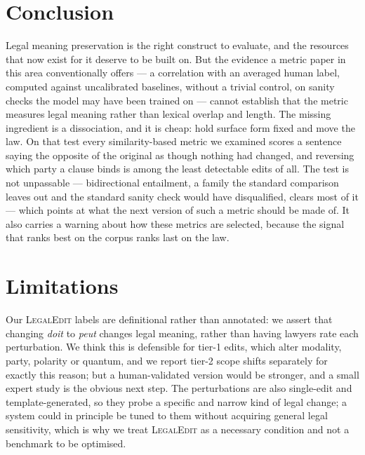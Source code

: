 \documentclass[11pt]{article}
\begin{document}
\section{Conclusion}

Legal meaning preservation is the right construct to evaluate, and the resources
that now exist for it deserve to be built on. But the evidence a metric paper in
this area conventionally offers --- a correlation with an averaged human label,
computed against uncalibrated baselines, without a trivial control, on sanity
checks the model may have been trained on --- cannot establish that the metric
measures legal meaning rather than lexical overlap and length. The missing
ingredient is a dissociation, and it is cheap: hold surface form fixed and move
the law. On that test every similarity-based metric we examined scores a
sentence saying the opposite of the original as though nothing had changed, and
reversing which party a clause binds is among the least detectable edits of all.
The test is not unpassable --- bidirectional entailment, a family the standard
comparison leaves out and the standard sanity check would have disqualified,
clears most of it --- which points at what the next version of such a metric
should be made of. It also carries a warning about how these metrics are
selected, because the signal that ranks best on the corpus ranks last on the law.

\section*{Limitations}
\label{sec:limits}

Our \textsc{LegalEdit} labels are definitional rather than annotated: we assert
that changing \emph{doit} to \emph{peut} changes legal meaning, rather than
having lawyers rate each perturbation. We think this is defensible for tier-1
edits, which alter modality, party, polarity or quantum, and we report tier-2
scope shifts separately for exactly this reason; but a human-validated version
would be stronger, and a small expert study is the obvious next step. The
perturbations are also single-edit and template-generated, so they probe a
specific and narrow kind of legal change; a system could in principle be tuned
to them without acquiring general legal sensitivity, which is why we treat
\textsc{LegalEdit} as a necessary condition and not a benchmark to be optimised.
\end{document}
